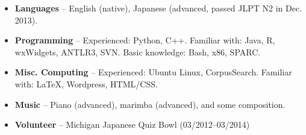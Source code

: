 \documentclass[10pt,oneside]{article}
\begin{document}
\begin{itemize}
	\item{\textbf{Languages} -- English (native), Japanese (advanced, passed JLPT N2 in Dec. 2013).}
	
	\item{\textbf{Programming} -- Experienced: Python, C++. Familiar with: Java, R, wxWidgets, ANTLR3, SVN. Basic knowledge: Bash, x86, SPARC.}
	
	\item{\textbf{Misc. Computing} -- Experienced: Ubuntu Linux, CorpusSearch. Familiar with: \LaTeX{}, Wordpress, HTML/CSS.}
	
	\item{\textbf{Music} --  Piano (advanced), marimba (advanced), and some composition.}
	
	\item{\textbf{Volunteer} -- Michigan Japanese Quiz Bowl (03/2012--03/2014)}
\end{itemize}
\end{document}
